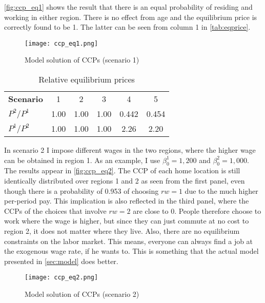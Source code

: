  \autoref{fig:ccp_eq1} shows the result that there is an equal probability of residing and working in either region. There is no effect from age and the equilibrium price is correctly found to be 1. The latter can be seen from column 1 in \autoref{tab:eqprice}. 
\begin{figure}
\centering
\texttt{[image: ccp\_eq1.png]} 
\caption{Model solution of CCPs (scenario 1)}
\label{fig:ccp_eq1}
\end{figure}

\begin{table}[htbp]\centering
\caption{Relative equilibrium prices \label{tab:eqprice}}
\begin{tabular} {@{} l c c c c c @{}} \\ \hline
\textbf{Scenario} & 1  & 2 & 3 & 4 & 5 \\
\textbf{ $P^2/P^1$} & 1.00  & 1.00 & 1.00 & 0.442 & 0.454 \\
\textbf{ $P^1/P^2$} & 1.00  & 1.00 & 1.00 & 2.26 & 2.20 \\
\hline\hline
\end{tabular}
\end{table}

In scenario 2 I impose different wages in the two regions, where the higher wage can be obtained in region 1. As an example, I use $\beta_0^1=1,200$ and $\beta_0^2=1,000$. The results appear in \autoref{fig:ccp_eq2}. The CCP of each home location is still identically distributed over regions 1 and 2 as seen from the first panel, even though there is a probability of 0.953 of choosing $rw=1$ due to the much higher per-period pay. This implication is also reflected in the third panel, where the CCPs of the choices that involve $rw=2$ are close to 0. People therefore choose to work where the wage is higher, but since they can just commute at no cost to region 2, it does not matter where they live. Also, there are no equilibrium constraints on the labor market. This means, everyone can always find a job at the exogenous wage rate, if he wants to. This is something that the actual model presente{}d in \autoref{sec:model} does better.
\begin{figure}
\centering
\texttt{[image: ccp\_eq2.png]} 
\caption{Model solution of CCPs (scenario 2)}
\label{fig:ccp_eq2}
\end{figure}


